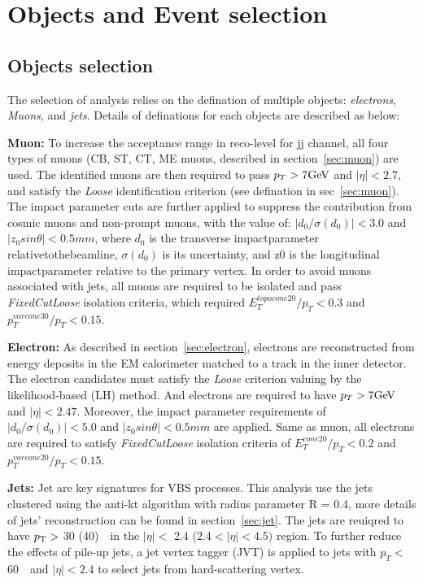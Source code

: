 \section{Objects and Event selection}

\subsection{Objects selection}

The selection of analysis relies on the defination of multiple objects: \textit{electrons}, \textit{Muons}, and \textit{jets}.
Details of definations for each objects are described as below:

\textbf{Muon:} 
To increase the acceptance range in reco-level for \llll jj channel, all four types of muons 
(CB, ST, CT, ME muons, described in section~\ref{sec:muon}) are used.
The identified muons are then required to pass $p_{T} > 7 \text{Ge\kern -0.1em V}$ and $|\eta| < 2.7$,
and satisfy the \textit{Loose} identification criterion (see defination in sec~\ref{sec:muon}).
The impact parameter cuts are further applied to suppress the contribution from cosmic muons and non-prompt muons,
with the value of: $|d_{0}/\sigma(d_{0})| < 3.0$ and $|z_{0} sin\theta| < 0.5 mm$,
where $d_{0}$ is the transverse impactparameter relativetothebeamline, $\sigma(d_{0})$ is its uncertainty, 
and z0 is the longitudinal impactparameter relative to the primary vertex.
In order to avoid muons associated with jets, all muons are required to be isolated and pass \textit{FixedCutLoose} isolation criteria,
which required $E_{T}^{topocone20} / p_{T} < 0.3$ and $p_{T}^{varcone30} / p_{T} < 0.15$.

\textbf{Electron:} 
As described in section~\ref{sec:electron}, electrons are reconstructed from energy deposits in the EM calorimeter matched to a track in the inner detector.
The electron candidates must satisfy the \textit{Loose} criterion valuing by the likelihood-based (LH) method.
And electrons are required to have $p_{T} > 7 \text{Ge\kern -0.1em V}$ and $|\eta| < 2.47$.
Moreover, the impact parameter requirements of $|d_{0}/\sigma(d_{0})| < 5.0$ and $|z_{0} sin\theta| < 0.5 mm$ are applied.
Same as muon, all electrons are required to satisfy \textit{FixedCutLoose} isolation criteria
of $E_{T}^{cone20} / p_{T} < 0.2$ and $p_{T}^{varcone20} / p_{T} < 0.15$.

\textbf{Jets:} 
Jet are key signatures for VBS processes. 
This analysis use the jets clustered using the anti-kt algorithm with radius parameter R = 0.4, more details of jets' reconstruction can be found in section~\ref{sec:jet}.
The jets are reuiqred to have $p_{\text{T}} >$ 30 (40)~\gev~in the $|\eta| <$ 2.4 ($2.4 < |\eta| < 4.5)$ region.
To further reduce the effects of pile-up jets, a jet vertex tagger (JVT) is applied to jets with $p_{T} <$ 60~\gev~and $|\eta| < 2.4$ to select jets from hard-scattering vertex.

